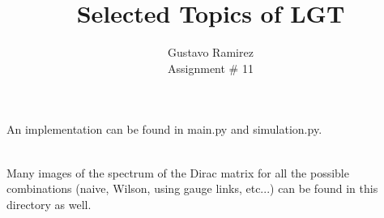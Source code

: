 \documentclass[11pt]{article}
\title{\textbf{Selected Topics of LGT}}
\author{Gustavo Ramirez\\
		Assignment \# 11}
\date{}
\begin{document}
\maketitle

An implementation can be found in main.py and simulation.py.

\ \\

Many images of the spectrum of the Dirac matrix for all the possible combinations (naive, Wilson, using gauge links, etc...) can be found in this directory as well.
\end{document}
